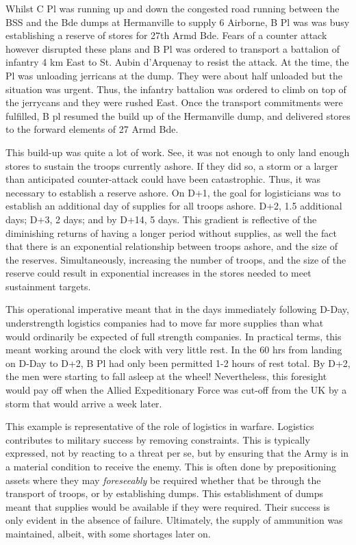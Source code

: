 \documentclass[noraggedright]{turabian-researchpaper}
\begin{document}
Whilst C Pl was running up and down the congested road running between the 
BSS and the Bde dumps at Hermanville to supply 6 Airborne, B Pl was was busy 
establishing a reserve of stores for 27th Armd Bde. Fears of a counter attack 
however disrupted these plans and B Pl was ordered to transport a battalion 
of infantry 4 km East to St. Aubin d'Arquenay to resist the attack.
At the time, the Pl was unloading jerricans at the dump.  They were about half
unloaded but the situation was urgent.  Thus, the infantry 
battalion was ordered to climb on top of the jerrycans and they were rushed 
East.  Once the transport commitments were fulfilled, B pl resumed the build 
up of the Hermanville dump, and delivered stores to the forward elements of 27 
Armd Bde.  

This build-up was quite a lot of work.  See, it was not enough
to only land enough stores to sustain the troops currently ashore.
If they did so, a storm or a larger than anticipated counter-attack could have
been catastrophic.  Thus, it was necessary to establish a reserve ashore.  
On D+1, the goal for logisticians was to establish an additional day of 
supplies for all troops ashore.  D+2, 1.5 additional days; D+3, 2 days; and 
by D+14, 5 days.  %
This gradient is reflective of the diminishing returns of having a longer 
period without supplies, as well the fact that there is an exponential 
relationship between troops ashore, and the size of the reserves.  
Simultaneously, increasing the number of troops, and the size of the reserve 
could result in exponential increases in the stores needed to meet sustainment 
targets.  

This operational imperative meant that in the days immediately 
following D-Day, understrength logistics companies had to move far more 
supplies than what would ordinarily be expected of full strength companies.  
In practical terms, this meant working around the clock with very little rest.
In the 60 hrs from landing on D-Day to D+2, B Pl had only been permitted 1-2 
hours of rest total.  
By D+2, the men were starting to fall asleep at the wheel! %
Nevertheless, this foresight would pay off when the Allied Expeditionary 
Force was cut-off from the UK by a storm that would arrive a week later.  

This example is representative of the role of logistics in warfare.  Logistics 
contributes to military success by removing constraints. This is typically
expressed, not by reacting to a threat per se, but by ensuring that the Army is
in a material condition to receive the enemy.  This is often done by 
prepositioning assets where they may \textit{foreseeably} be 
required whether that be through the transport of troops, or by establishing 
dumps.  This establishment of dumps meant that supplies would be available 
if they were required.  Their success is only evident in the absence 
of failure.  Ultimately, the supply of ammunition was maintained, albeit, 
with some shortages later on.
\end{document}
